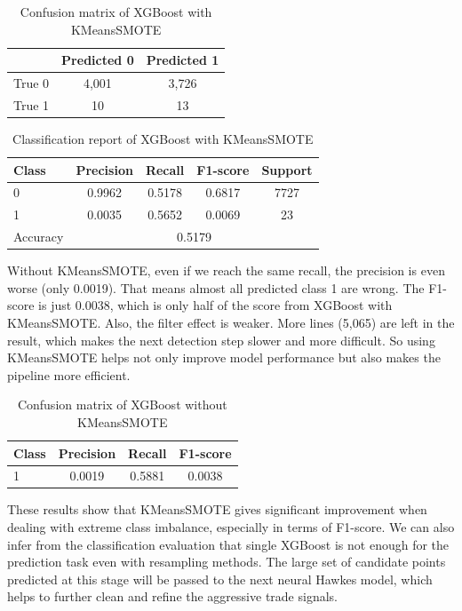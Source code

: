 \begin{table}[H]
    \centering
    \caption{Confusion matrix of XGBoost with KMeansSMOTE}
    \label{tab:xgb-confusion-km}
    \begin{tabular}{lcc}
        \toprule
        & Predicted 0 & Predicted 1 \\
        \midrule
        True 0 & 4,001 & 3,726 \\
        True 1 & 10 & 13 \\
        \bottomrule
    \end{tabular}
\end{table}
\begin{table}[H]
    \centering
    \caption{Classification report of XGBoost with KMeansSMOTE}
    \label{tab:xgb-classification-report-km}
    \begin{tabular}{lcccc}
        \toprule
        Class & Precision & Recall & F1-score & Support \\
        \midrule
        0 & 0.9962 & 0.5178 & 0.6817 & 7727 \\
        1 & 0.0035 & 0.5652 & 0.0069 & 23 \\
        \midrule
        Accuracy & \multicolumn{4}{c}{0.5179} \\
        \bottomrule
    \end{tabular}
\end{table}

Without KMeansSMOTE, even if we reach the same recall, the precision is even worse (only 0.0019). That means almost all predicted class 1 are wrong. The F1-score is just 0.0038, which is only half of the score from XGBoost with KMeansSMOTE. Also, the filter effect is weaker. More lines (5,065) are left in the result, which makes the next detection step slower and more difficult. So using KMeansSMOTE helps not only improve model performance but also makes the pipeline more efficient.

\begin{table}[H]
    \centering
    \caption{Confusion matrix of XGBoost without KMeansSMOTE}
    \label{tab:xgb-noKM}
    \begin{tabular}{lccc}
        \toprule
        Class & Precision & Recall & F1-score\\
        \midrule
        1 & 0.0019 & 0.5881 & 0.0038 \\        
        \bottomrule
    \end{tabular}
\end{table}

These results show that KMeansSMOTE gives significant improvement when dealing with extreme class imbalance, especially in terms of F1-score. We can also infer from the classification evaluation that single XGBoost is not enough for the prediction task even with resampling methods. The large set of candidate points predicted at this stage will be passed to the next neural Hawkes model, which helps to further clean and refine the aggressive trade signals. 



